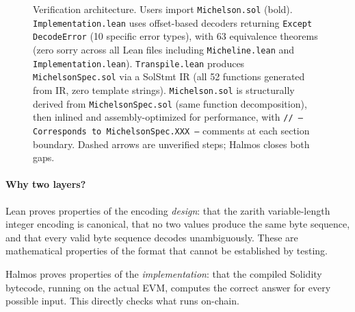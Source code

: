 \documentclass[11pt,a4paper]{article}
\begin{document}
\begin{figure}[h]
\caption{Verification architecture. Users import \texttt{Michelson.sol} (bold).
\texttt{Implementation.lean} uses offset-based decoders returning
\texttt{Except DecodeError} (10 specific error types), with 63 equivalence
theorems (zero sorry across all Lean files including \texttt{Micheline.lean}
and \texttt{Implementation.lean}).
\texttt{Transpile.lean} produces \texttt{MichelsonSpec.sol} via a SolStmt IR
(all 52 functions generated from IR, zero template strings).
\texttt{Michelson.sol} is structurally derived from \texttt{MichelsonSpec.sol}
(same function decomposition), then inlined and assembly-optimized for performance,
with \texttt{// -- Corresponds to MichelsonSpec.XXX --} comments at each section
boundary.
Dashed arrows are unverified steps; Halmos closes both gaps.}
\label{fig:arch}
\end{figure}

\paragraph{Why two layers?} Lean proves properties of the encoding \emph{design}:
that the zarith variable-length integer encoding is canonical, that no two values
produce the same byte sequence, and that every valid byte sequence decodes
unambiguously. These are mathematical properties of the format that cannot be
established by testing.

Halmos proves properties of the \emph{implementation}: that the compiled
Solidity bytecode, running on the actual EVM, computes the correct answer for
every possible input. This directly checks what runs on-chain.
\end{document}
